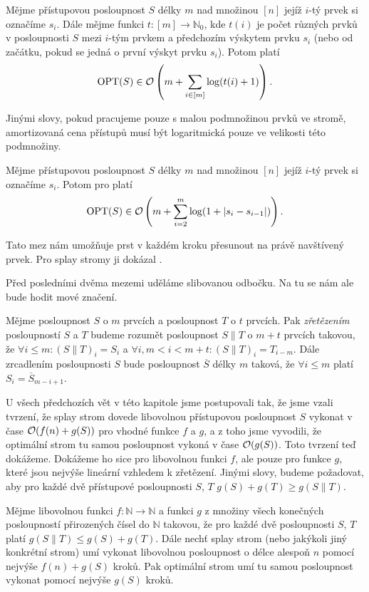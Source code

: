 \begin{veta}

Mějme přístupovou posloupnost $S$ délky $m$ nad množinou $[n]$ jejíž $i$-tý prvek si označíme $s_i$. Dále mějme funkci $t: [m]\rightarrow \mathbb N_0$, kde $t(i)$ je počet různých prvků v posloupnosti $S$ mezi $i$-tým prvkem a předchozím výskytem prvku $s_i$ (nebo od začátku, pokud se jedná o první výskyt prvku $s_i$). Potom platí $$\operatorname{OPT}(S) \in \mathcal O\left(m + \sum_{i\in [m]}\log (t(i)+1) \right).$$
\end{veta}

Jinými slovy, pokud pracujeme pouze s malou podmnožinou prvků ve stromě, amortizovaná cena přístupů musí být logaritmická pouze ve velikosti této podmnožiny.

\begin{veta}
Mějme přístupovou posloupnost $S$ délky $m$ nad množinou $[n]$ jejíž $i$-tý prvek si označíme $s_i$. Potom pro platí $$\operatorname{OPT}(S) \in \mathcal O\left(m + \sum_{i=2}^m \log(1 + |s_{i}-s_{i-1}|) \right).$$
\end{veta}

Tato mez nám umožňuje prst v každém kroku přesunout na právě navštívený prvek. Pro splay stromy ji dokázal \citet{dynamicfinger}.

Před posledními dvěma mezemi uděláme slibovanou odbočku. Na tu se nám ale bude 
hodit mové značení.

\begin{definice}
Mějme posloupnost $S$ o $m$ prvcích a posloupnost $T$ o $t$ prvcích. Pak \emph{zřetězením} posloupností $S$ a $T$ budeme rozumět posloupnost $S\|T$ o $m+t$ prvcích takovou, že $\forall i\leq m: (S\|T)_i = S_i$ a $\forall i, m<i<m+t: (S\|T)_i = T_{i-m}$. Dále zrcadlením posloupnosti $S$ bude posloupnost $\overline{S}$ délky $m$ taková, že $\forall i\leq m$ platí $S_i = \overline{S}_{m-i+1}$. 
\end{definice}

U všech předchozích
vět v této kapitole jsme postupovali tak, že jsme vzali tvrzení, že splay strom
dovede libovolnou přístupovou posloupnost $S$ vykonat v čase $\mathcal O(f(n)+g(S))$
pro vhodné funkce $f$ a $g$, a z toho jsme vyvodili, že optimální strom tu
samou posloupnost vykoná v čase $\mathcal O(g(S))$. Toto tvrzení teď dokážeme. Dokážeme
ho sice pro libovolnou funkci $f$, ale pouze pro funkce $g$, které jsou nejvýše
lineární vzhledem k zřetězení. Jinými slovy, budeme požadovat, aby pro každé dvě přístupové posloupnosti $S$, $T$ $g(S) + g(T)\geq
g(S\|T)$.
\begin{tvrz}\label{tvrz:konstantypryc}
Mějme libovolnou funkci $f:\mathbb N \rightarrow \mathbb N$ a funkci $g$ z množiny všech konečných posloupností přirozených čísel do $\mathbb N$ 
takovou, že pro každé dvě posloupnosti $S$, $T$ platí $g(S\|T)\leq g(S)+g(T)$. Dále nechť splay strom (nebo jakýkoli jiný
konkrétní strom) umí vykonat libovolnou posloupnost o délce alespoň $n$ pomocí nejvýše
$f(n) + g(S)$ kroků. Pak optimální strom umí tu samou posloupnost vykonat pomocí nejvýše $g(S)$ kroků.
\end{tvrz}

